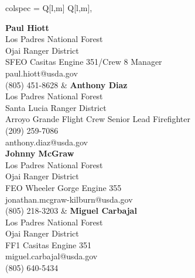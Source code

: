 \documentclass[a4paper,9pt]{extarticle}
\begin{document}
\begin{center}
\begin{tblr}{
    colspec = {Q[l,m] Q[l,m]},
}

{\textbf{Paul Hiott} \\
Los Padres National Forest \\
Ojai Ranger District \\
SFEO Casitas Engine 351/Crew 8 Manager \\
paul.hiott@usda.gov \\
(805) 451-8628}
&
{\textbf{Anthony Diaz} \\
Los Padres National Forest \\
Santa Lucia Ranger District \\
Arroyo Grande Flight Crew Senior Lead Firefighter \\
(209) 259-7086 \\
anthony.diaz@usda.gov} \\

{\textbf{Johnny McGraw} \\
Los Padres National Forest \\
Ojai Ranger District \\
FEO Wheeler Gorge Engine 355 \\
jonathan.mcgraw-kilburn@usda.gov \\
(805) 218-3203}
&
{\textbf{Miguel Carbajal} \\
Los Padres National Forest \\
Ojai Ranger District \\
FF1 Casitas Engine 351 \\
miguel.carbajal@usda.gov \\
(805) 640-5434}

\end{tblr}
\end{center}
\end{document}
